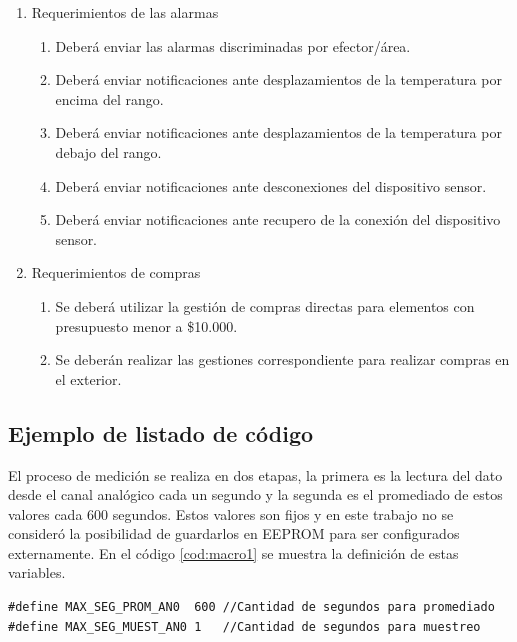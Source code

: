 \begin{enumerate}
\item Requerimientos de las alarmas
	\begin{enumerate}
	\item Deberá enviar las alarmas discriminadas por efector/área.
	\item Deberá enviar notificaciones ante desplazamientos de la temperatura por encima del rango.
	\item Deberá enviar notificaciones ante desplazamientos de la temperatura por debajo del rango.
	\item Deberá enviar notificaciones ante desconexiones del dispositivo sensor.
	\item Deberá enviar notificaciones ante recupero de la conexión del dispositivo sensor.
	 \end{enumerate}	 

\item Requerimientos de compras
	\begin{enumerate}
	\item Se deberá utilizar la gestión de compras directas para elementos con presupuesto menor a {\$10.000}.
	\item Se deberán realizar las gestiones correspondiente para realizar compras en el exterior.
	\end{enumerate}
\end{enumerate}

\subsection{Ejemplo de listado de código}



El proceso de medición se realiza en dos etapas, la primera es la lectura del dato desde el canal analógico cada un segundo y la segunda es el promediado de estos valores cada 600 segundos. Estos valores son fijos y en este trabajo no se consideró la posibilidad de guardarlos en EEPROM para ser configurados externamente. En el código \ref{cod:macro1} se muestra la definición de estas variables.
\vspace{1cm}

\begin{lstlisting}[caption={Macros para definir tiempo de promedio y tiempo de muestreo.},label={cod:macro1}]
#define MAX_SEG_PROM_AN0  600 //Cantidad de segundos para promediado
#define MAX_SEG_MUEST_AN0 1   //Cantidad de segundos para muestreo

\end{lstlisting}

